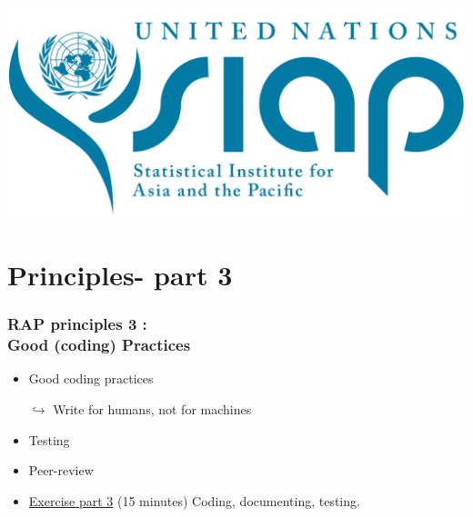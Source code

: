 \documentclass[xcolor=x11names,compress]{beamer}
\renewcommand{\(}{\begin{columns}}
\renewcommand{\)}{\end{columns}}
\newcommand{\<}[1]{\begin{column}{#1}}
\renewcommand{\>}{\end{column}}
\begin{document}
\begin{frame}
\begin{center}
\Large{ \color{brique}{Tea Break}}
\vspace{0.5cm}

\includegraphics[height=0.15\textwidth]{SIAP_logo_Big.png}
\end{center}
\end{frame}


\section{Principles- part 3}

\begin{frame}[<+->]
   \frametitle{RAP principles 3 :  \\Good (coding) Practices}
   \pause
    \begin{itemize}[<+->]
     \item Good coding practices
     \item[$\hookrightarrow$] Write for humans, not for machines
     \item Testing
     \item Peer-review
     \item \href{https://sergegoussev.github.io/ESCAP_RAP_class/docs/teaching_materials/sept_18/sept_18_session.html\#principle-6-good-coding-practices}{Exercise part 3} (15 minutes) Coding, documenting, testing.  
    \end{itemize}
\end{frame}
\end{document}
